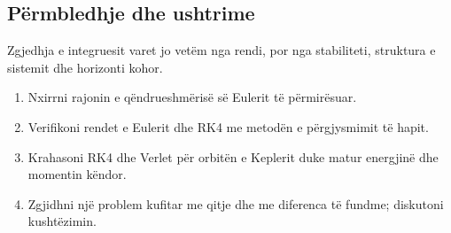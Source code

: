 \subsection{Përmbledhje dhe ushtrime}
Zgjedhja e integruesit varet jo vetëm nga rendi, por nga stabiliteti, struktura e sistemit dhe horizonti kohor.
\begin{enumerate}
\item Nxirrni rajonin e qëndrueshmërisë së Eulerit të përmirësuar.
\item Verifikoni rendet e Eulerit dhe RK4 me metodën e përgjysmimit të hapit.
\item Krahasoni RK4 dhe Verlet për orbitën e Keplerit duke matur energjinë dhe momentin këndor.
\item Zgjidhni një problem kufitar me qitje dhe me diferenca të fundme; diskutoni kushtëzimin.
\end{enumerate}
